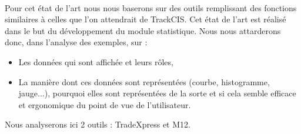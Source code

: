 			\paragraph{}
			Pour cet état de l’art nous nous baserons sur des outils remplissant des
			fonctions similaires à celles que l’on attendrait de TrackCIS. Cet état de
			l’art est réalisé dans le but du développement du module statistique. Nous
			nous attarderons donc, dans l’analyse des exemples, sur :
			\begin{itemize}
			  \item Les données qui sont affichée et leurs rôles,
			  \item La manière dont ces données sont représentées (courbe, histogramme,
			  jauge...), pourquoi elles sont représentées de la sorte et si cela semble
			  efficace et ergonomique du point de vue de l’utilisateur.
			\end{itemize}
			Nous analyserons ici 2 outils : TradeXpress et M12.
			
